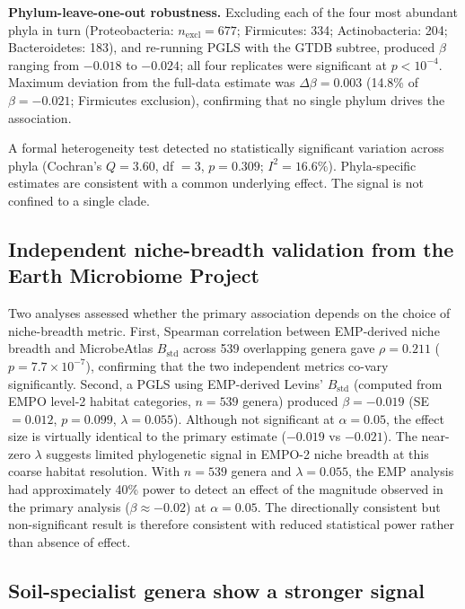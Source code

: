 \documentclass[times]{zHenriquesLab-StyleBioRxiv}
\begin{document}
\textbf{Phylum-leave-one-out robustness.} Excluding each of the four most
abundant phyla in turn (Proteobacteria: $n_\mathrm{excl} = 677$;
Firmicutes: 334; Actinobacteria: 204; Bacteroidetes: 183), and re-running
PGLS with the GTDB subtree, produced $\beta$ ranging from $-0.018$ to
$-0.024$; all four replicates were significant at $p < 10^{-4}$.
Maximum deviation from the full-data estimate was $\Delta\beta = 0.003$
(14.8\% of $\beta = -0.021$; Firmicutes exclusion), confirming that no
single phylum drives the association.

A formal heterogeneity test detected no statistically significant variation
across phyla (Cochran's $Q = 3.60$, df $= 3$, $p = 0.309$; $I^2 = 16.6\%$).
Phyla-specific estimates are consistent with a common underlying effect. The
signal is not confined to a single clade.



\subsection{Independent niche-breadth validation from the Earth Microbiome
Project}

Two analyses assessed whether the primary association depends on the choice of
niche-breadth metric. First, Spearman correlation between EMP-derived niche
breadth and MicrobeAtlas $B_\mathrm{std}$ across 539 overlapping genera gave
$\rho = 0.211$ ($p = 7.7 \times 10^{-7}$), confirming that the two independent
metrics co-vary significantly. Second, a PGLS using EMP-derived Levins'
$B_\mathrm{std}$ (computed from EMPO level-2 habitat categories, $n = 539$
genera) produced $\beta = -0.019$ (SE $= 0.012$, $p = 0.099$,
$\lambda = 0.055$). Although not significant at $\alpha = 0.05$, the effect
size is virtually identical to the primary estimate ($-0.019$ vs $-0.021$). The near-zero
$\lambda$ suggests limited phylogenetic signal in EMPO-2 niche breadth at this
coarse habitat resolution. With $n = 539$ genera and $\lambda = 0.055$, the
EMP analysis had approximately 40\% power to detect an effect of the magnitude
observed in the primary analysis ($\beta \approx -0.02$) at $\alpha = 0.05$.
The directionally consistent but non-significant result is therefore consistent
with reduced statistical power rather than absence of effect.



\subsection{Soil-specialist genera show a stronger signal}
\end{document}
